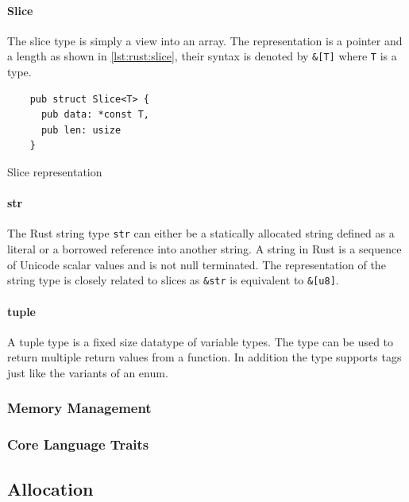 \paragraph{Slice}

The slice type is simply a view into an array.
The representation is a pointer and a length as shown in \autoref{lst:rust:slice}, their syntax is denoted by \texttt{\&[T]} where \texttt{T} is a type.

\begin{listing}[H]
  \begin{verbatim}
    pub struct Slice<T> {
      pub data: *const T,
      pub len: usize
    }
\end{verbatim}
\caption{Slice representation}
\label{lst:rust:slice}
\end{listing}

\paragraph{str}
\label{par:rust:str}

The Rust string type \texttt{str} can either be a statically allocated string defined as a literal or a borrowed reference into another string.
A string in Rust is a sequence of Unicode scalar values and is not null terminated.
The representation of the string type is closely related to slices as \texttt{\&str} is equivalent to \texttt{\&[u8]}.

\paragraph{tuple}

A tuple type is a fixed size datatype of variable types.
The type can be used to return multiple return values from a function.
In addition the type supports tags just like the variants of an enum.

\subsubsection{Memory Management}
\subsubsection{Core Language Traits}

\subsection{Allocation}
\label{sec:rust:allocation}

